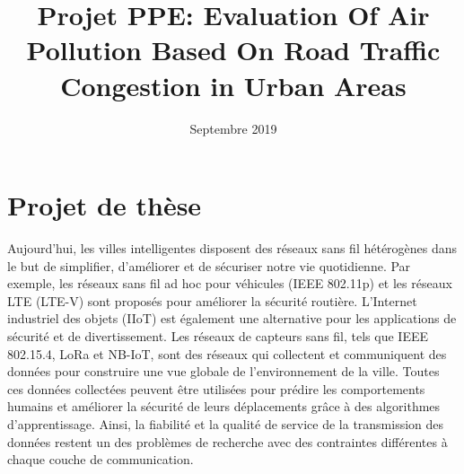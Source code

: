 



\usepackage[papersize={8.5in,11in}, left=0.9in, right=0.9in, top=1in, bottom=1in]{geometry}

\title{\textbf{Projet PPE:} Evaluation Of Air Pollution Based On  Road Traffic Congestion in Urban Areas}
\date{Septembre 2019}


\maketitle


\section{Projet de thèse}

Aujourd'hui,
	les villes intelligentes disposent des réseaux sans fil hétérogènes dans le but de simplifier,
	d'améliorer et de sécuriser notre vie quotidienne.
Par exemple,
	les réseaux sans fil ad hoc pour véhicules (IEEE 802.11p) et les réseaux LTE (LTE-V) sont proposés pour améliorer la sécurité routière.
L'Internet industriel des objets (IIoT) est également une alternative pour les applications de sécurité et de divertissement.
Les réseaux de capteurs sans fil,
	tels que IEEE 802.15.4,
	LoRa et NB-IoT,
	sont des réseaux qui collectent et communiquent des données pour construire une vue globale de l'environnement de la ville.
Toutes ces données collectées peuvent être utilisées pour prédire les comportements humains et améliorer la sécurité de leurs déplacements grâce à des algorithmes d'apprentissage.
Ainsi,
	la fiabilité et la qualité de service de la transmission des données restent un des problèmes de recherche avec des contraintes différentes à chaque couche de communication.

